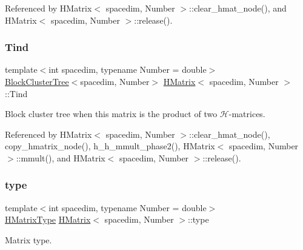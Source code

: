 Referenced by H\+Matrix$<$ spacedim, Number $>$\+::clear\+\_\+hmat\+\_\+node(), and H\+Matrix$<$ spacedim, Number $>$\+::release().

\mbox{\label{classHMatrix_a12da9454687e5ca15837d63e2bf0b595}} 
\subsubsection{\texorpdfstring{Tind}{Tind}}
{\footnotesize\ttfamily template$<$int spacedim, typename Number = double$>$ \\
\hyperlink{classBlockClusterTree}{Block\+Cluster\+Tree}$<$spacedim, Number$>$ \hyperlink{classHMatrix}{H\+Matrix}$<$ spacedim, Number $>$\+::Tind\hspace{0.3cm}{\ttfamily [private]}}

Block cluster tree when this matrix is the product of two $\mathcal{H}$-\/matrices. 

Referenced by H\+Matrix$<$ spacedim, Number $>$\+::clear\+\_\+hmat\+\_\+node(), copy\+\_\+hmatrix\+\_\+node(), h\+\_\+h\+\_\+mmult\+\_\+phase2(), H\+Matrix$<$ spacedim, Number $>$\+::mmult(), and H\+Matrix$<$ spacedim, Number $>$\+::release().

\mbox{\label{classHMatrix_a89ef60f3ba737c04708195ca0bb13620}} 
\subsubsection{\texorpdfstring{type}{type}}
{\footnotesize\ttfamily template$<$int spacedim, typename Number = double$>$ \\
\hyperlink{hmatrix_8h_ac04719e202c88f36e4533fe1d326a494}{H\+Matrix\+Type} \hyperlink{classHMatrix}{H\+Matrix}$<$ spacedim, Number $>$\+::type\hspace{0.3cm}{\ttfamily [private]}}

Matrix type. 

